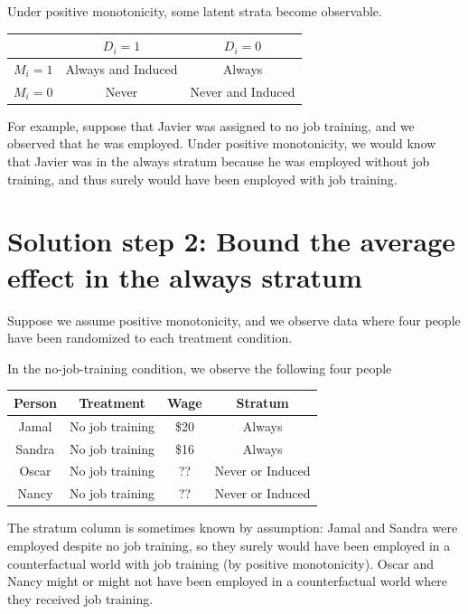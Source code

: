 \documentclass[
]{book}
\begin{document}
Under positive monotonicity, some latent strata become observable.

\begin{longtable}[]{@{}ccc@{}}
\toprule\noalign{}
& \(D_i = 1\) & \(D_i = 0\) \\
\midrule\noalign{}
\endhead
\bottomrule\noalign{}
\endlastfoot
\(M_i = 1\) & Always and Induced & Always \\
\(M_i = 0\) & Never & Never and Induced \\
\end{longtable}

For example, suppose that Javier was assigned to no job training, and we observed that he was employed. Under positive monotonicity, we would know that Javier was in the always stratum because he was employed without job training, and thus surely would have been employed with job training.

\section{Solution step 2: Bound the average effect in the always stratum}\label{solution-step-2-bound-the-average-effect-in-the-always-stratum}

Suppose we assume positive monotonicity, and we observe data where four people have been randomized to each treatment condition.

In the no-job-training condition, we observe the following four people

\begin{longtable}[]{@{}cccc@{}}
\toprule\noalign{}
Person & Treatment & Wage & Stratum \\
\midrule\noalign{}
\endhead
\bottomrule\noalign{}
\endlastfoot
Jamal & No job training & \$20 & Always \\
Sandra & No job training & \$16 & Always \\
Oscar & No job training & ?? & Never or Induced \\
Nancy & No job training & ?? & Never or Induced \\
\end{longtable}

The stratum column is sometimes known by assumption: Jamal and Sandra were employed despite no job training, so they surely would have been employed in a counterfactual world with job training (by positive monotonicity). Oscar and Nancy might or might not have been employed in a counterfactual world where they received job training.
\end{document}
